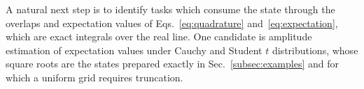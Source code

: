 A natural next step is to identify tasks which consume the state
through the overlaps and expectation values of
Eqs.~\eqref{eq:quadrature} and~\eqref{eq:expectation}, which are exact integrals over the
real line.  One candidate is amplitude estimation of expectation
values under Cauchy and Student $t$ distributions, whose square
roots are the states prepared exactly in
Sec.~\ref{subsec:examples} and for which a uniform grid requires
truncation.
